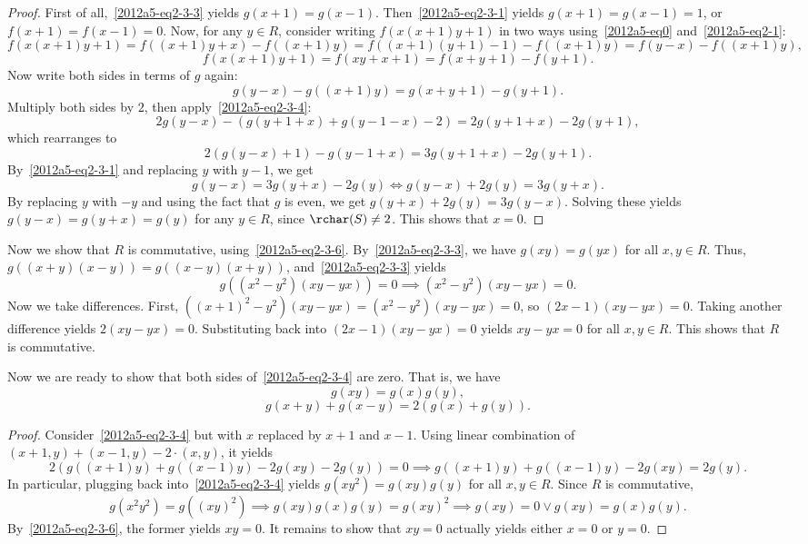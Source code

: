 \begin{itemize}
    \begin{proof}
    First of all,~\eqref{2012a5-eq2-3-3} yields $g(x + 1) = g(x - 1)$.
    Then~\eqref{2012a5-eq2-3-1} yields $g(x + 1) = g(x - 1) = 1$, or $f(x + 1) = f(x - 1) = 0$.
    Now, for any $y \in R$, consider writing $f(x(x + 1)y + 1)$ in two ways using~\eqref{2012a5-eq0} and~\eqref{2012a5-eq2-1}:
    \[ f(x(x + 1)y + 1) = f((x + 1)y + x) - f((x + 1)y) = f((x + 1)(y + 1) - 1) - f((x + 1)y) = f(y - x) - f((x + 1)y), \]
    \[ f(x(x + 1)y + 1) = f(xy + x + 1) = f(x + y + 1) - f(y + 1). \]
    Now write both sides in terms of $g$ again:
    \[ g(y - x) - g((x + 1)y) = g(x + y + 1) - g(y + 1). \]
    Multiply both sides by $2$, then apply~\eqref{2012a5-eq2-3-4}:
    \[ 2 g(y - x) - (g(y + 1 + x) + g(y - 1 - x) - 2) = 2 g(y + 1 + x) - 2 g(y + 1), \]
        which rearranges to
    \[ 2 (g(y - x) + 1) - g(y - 1 + x) = 3 g(y + 1 + x) - 2 g(y + 1). \]
    By~\eqref{2012a5-eq2-3-1} and replacing $y$ with $y - 1$, we get
    \[ g(y - x) = 3 g(y + x) - 2 g(y) \iff g(y - x) + 2 g(y) = 3 g(y + x). \]
    By replacing $y$ with $-y$ and using the fact that $g$ is even, we get $g(y + x) + 2 g(y) = 3 g(y - x)$.
    Solving these yields $g(y - x) = g(y + x) = g(y)$ for any $y \in R$, since $\rchar(S) \neq 2$.
    This shows that $x = 0$.
    \end{proof}

    Now we show that $R$ is commutative, using~\eqref{2012a5-eq2-3-6}.
    By~\eqref{2012a5-eq2-3-3}, we have $g(xy) = g(yx)$ for all $x, y \in R$.
    Thus, $g((x + y)(x - y)) = g((x - y)(x + y))$, and~\eqref{2012a5-eq2-3-3} yields
    \[ g((x^2 - y^2)(xy - yx)) = 0 \implies (x^2 - y^2)(xy - yx) = 0. \]
    Now we take differences.
    First, $((x + 1)^2 - y^2)(xy - yx) = (x^2 - y^2)(xy - yx) = 0$, so $(2x - 1)(xy - yx) = 0$.
    Taking another difference yields $2(xy - yx) = 0$.
    Substituting back into $(2x - 1)(xy - yx) = 0$ yields $xy - yx = 0$ for all $x, y \in R$.
    This shows that $R$ is commutative.

    Now we are ready to show that both sides of~\eqref{2012a5-eq2-3-4} are zero.
    That is, we have
    \[ g(xy) = g(x) g(y), \tag{2.3.7}\label{2012a5-eq2-3-7} \]
    \[ g(x + y) + g(x - y) = 2(g(x) + g(y)). \tag{2.3.8}\label{2012a5-eq2-3-8} \]

    \begin{proof}
    Consider~\eqref{2012a5-eq2-3-4} but with $x$ replaced by $x + 1$ and $x - 1$.
    Using linear combination of $(x + 1, y) + (x - 1, y) - 2 \cdot (x, y)$, it yields
    \[ 2 (g((x + 1) y) + g((x - 1) y) - 2 g(xy) - 2 g(y)) = 0 \implies g((x + 1) y) + g((x - 1) y) - 2 g(xy) = 2 g(y). \]
    In particular, plugging back into~\eqref{2012a5-eq2-3-4} yields $g(xy^2) = g(xy) g(y)$ for all $x, y \in R$.
    Since $R$ is commutative,
    \[ g(x^2 y^2) = g((xy)^2) \implies g(xy) g(x) g(y) = g(xy)^2 \implies g(xy) = 0 \vee g(xy) = g(x) g(y). \]
    By~\eqref{2012a5-eq2-3-6}, the former yields $xy = 0$.
    It remains to show that $xy = 0$ actually yields either $x = 0$ or $y = 0$.


\end{proof}
\end{itemize}

